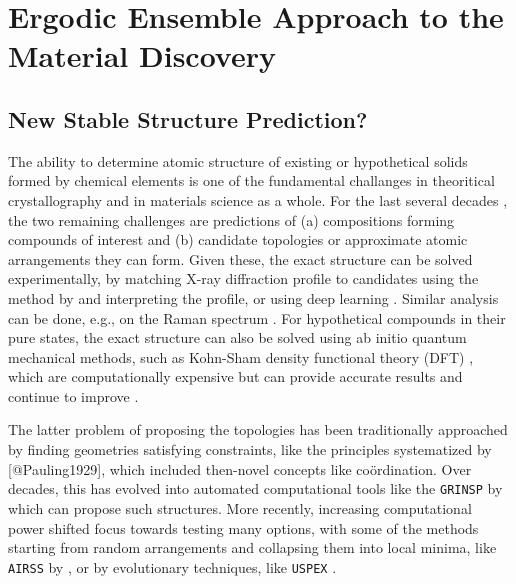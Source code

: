 \chapter{Ergodic Ensemble Approach to the Material Discovery} \label{chap:crystall}


\section{New Stable Structure Prediction?} \label{crystall:sec:newstable}

The ability to determine atomic structure of existing or hypothetical solids formed by chemical elements is one of the fundamental challanges in theoritical crystallography and in materials science as a whole. For the last several decades \cite{Hawthorne1994}, the two remaining challenges are predictions of (a) compositions forming compounds of interest and (b) candidate topologies or approximate atomic arrangements they can form. Given these, the exact structure can be solved experimentally, by matching X-ray diffraction profile to candidates using the method by \citet{LeBail1988} and interpreting the profile, or using deep learning \cite{Yue2024}. Similar analysis can be done, e.g., on the Raman spectrum \cite{Ferrari2013}. For hypothetical compounds in their pure states, the exact structure can also be solved using ab initio quantum mechanical methods, such as Kohn-Sham density functional theory (DFT) \cite{Kohn1965}, which are computationally expensive but can provide accurate results and continue to improve \cite{Kothakonda2023}.

The latter problem of proposing the topologies has been traditionally approached by finding geometries satisfying constraints, like the principles systematized by [@Pauling1929], which included then-novel concepts like coördination. Over decades, this has evolved into automated computational tools like the \texttt{GRINSP} by \citet{LeBail2005} which can propose such structures. More recently, increasing computational power shifted focus towards testing many options, with some of the methods starting from random arrangements and collapsing them into local minima, like \texttt{AIRSS} by \citet{Pickard2011}, or by evolutionary techniques, like \texttt{USPEX} \cite{Glass2006}. 

